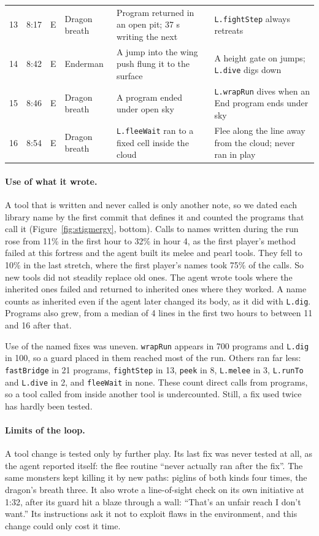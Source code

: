 \documentclass[11pt,a4paper]{article}
\begin{document}
\begin{table}[t]
\begin{tabularx}{\textwidth}{@{}rlclXX@{}}
    13 & 8:17 & E & Dragon breath & Program returned in an open pit; 37 s writing the next & \texttt{L.fightStep} always retreats \\
    14 & 8:42 & E & Enderman & A jump into the wing push flung it to the surface & A height gate on jumps; \texttt{L.dive} digs down \\
    15 & 8:46 & E & Dragon breath & A program ended under open sky & \texttt{L.wrapRun} dives when an End program ends under sky \\
    16 & 8:54 & E & Dragon breath & \texttt{L.fleeWait} ran to a fixed cell inside the cloud & Flee along the line away from the cloud; never ran in play \\
    \bottomrule
  \end{tabularx}
\end{table}

\paragraph{Use of what it wrote.} A tool that is written and never called is only another note, so we dated each library name by the first commit that defines it and counted the programs that call it (Figure~\ref{fig:stigmergy}, bottom). Calls to names written during the run rose from 11\% in the first hour to 32\% in hour 4, as the first player's method failed at this fortress and the agent built its melee and pearl tools. They fell to 10\% in the last stretch, where the first player's names took 75\% of the calls. So new tools did not steadily replace old ones. The agent wrote tools where the inherited ones failed and returned to inherited ones where they worked. A name counts as inherited even if the agent later changed its body, as it did with \texttt{L.dig}. Programs also grew, from a median of 4 lines in the first two hours to between 11 and 16 after that.

Use of the named fixes was uneven. \texttt{wrapRun} appears in 700 programs and \texttt{L.dig} in 100, so a guard placed in them reached most of the run. Others ran far less: \texttt{fastBridge} in 21 programs, \texttt{fightStep} in 13, \texttt{peek} in 8, \texttt{L.melee} in 3, \texttt{L.runTo} and \texttt{L.dive} in 2, and \texttt{fleeWait} in none. These count direct calls from programs, so a tool called from inside another tool is undercounted. Still, a fix used twice has hardly been tested.

\paragraph{Limits of the loop.} A tool change is tested only by further play. Its last fix was never tested at all, as the agent reported itself: the flee routine ``never actually ran after the fix''. The same monsters kept killing it by new paths: piglins of both kinds four times, the dragon's breath three. It also wrote a line-of-sight check on its own initiative at 1:32, after its guard hit a blaze through a wall: ``That's an unfair reach I don't want.'' Its instructions ask it not to exploit flaws in the environment, and this change could only cost it time.
\end{document}

